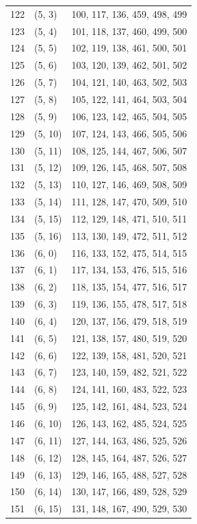 \documentclass{article}
\begin{document}
\begin{longtable}{lll}
  122 & (5, 3) & 100, 117, 136, 459, 498, 499 \\
  123 & (5, 4) & 101, 118, 137, 460, 499, 500 \\
  124 & (5, 5) & 102, 119, 138, 461, 500, 501 \\
  125 & (5, 6) & 103, 120, 139, 462, 501, 502 \\
  126 & (5, 7) & 104, 121, 140, 463, 502, 503 \\
  127 & (5, 8) & 105, 122, 141, 464, 503, 504 \\
  128 & (5, 9) & 106, 123, 142, 465, 504, 505 \\
  129 & (5, 10) & 107, 124, 143, 466, 505, 506 \\
  130 & (5, 11) & 108, 125, 144, 467, 506, 507 \\
  131 & (5, 12) & 109, 126, 145, 468, 507, 508 \\
  132 & (5, 13) & 110, 127, 146, 469, 508, 509 \\
  133 & (5, 14) & 111, 128, 147, 470, 509, 510 \\
  134 & (5, 15) & 112, 129, 148, 471, 510, 511 \\
  135 & (5, 16) & 113, 130, 149, 472, 511, 512 \\
  136 & (6, 0) & 116, 133, 152, 475, 514, 515 \\
  137 & (6, 1) & 117, 134, 153, 476, 515, 516 \\
  138 & (6, 2) & 118, 135, 154, 477, 516, 517 \\
  139 & (6, 3) & 119, 136, 155, 478, 517, 518 \\
  140 & (6, 4) & 120, 137, 156, 479, 518, 519 \\
  141 & (6, 5) & 121, 138, 157, 480, 519, 520 \\
  142 & (6, 6) & 122, 139, 158, 481, 520, 521 \\
  143 & (6, 7) & 123, 140, 159, 482, 521, 522 \\
  144 & (6, 8) & 124, 141, 160, 483, 522, 523 \\
  145 & (6, 9) & 125, 142, 161, 484, 523, 524 \\
  146 & (6, 10) & 126, 143, 162, 485, 524, 525 \\
  147 & (6, 11) & 127, 144, 163, 486, 525, 526 \\
  148 & (6, 12) & 128, 145, 164, 487, 526, 527 \\
  149 & (6, 13) & 129, 146, 165, 488, 527, 528 \\
  150 & (6, 14) & 130, 147, 166, 489, 528, 529 \\
  151 & (6, 15) & 131, 148, 167, 490, 529, 530 \\

\end{longtable}
\end{document}
